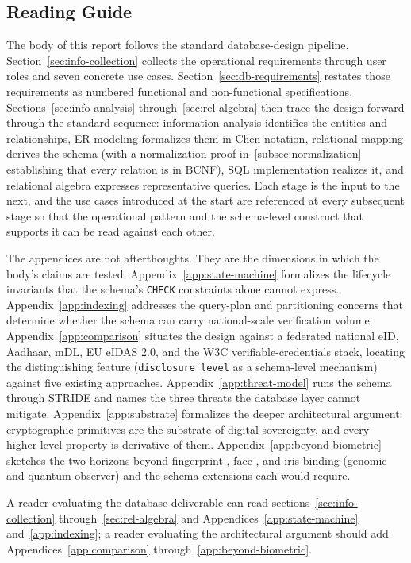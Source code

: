 \documentclass[11pt,letterpaper]{article}
\begin{document}
\subsection{Reading Guide}
\label{subsec:reading-guide}

The body of this report follows the standard database-design pipeline. Section~\ref{sec:info-collection} collects the operational requirements through user roles and seven concrete use cases. Section~\ref{sec:db-requirements} restates those requirements as numbered functional and non-functional specifications. Sections~\ref{sec:info-analysis} through~\ref{sec:rel-algebra} then trace the design forward through the standard sequence: information analysis identifies the entities and relationships, ER modeling formalizes them in Chen notation, relational mapping derives the schema (with a normalization proof in~\ref{subsec:normalization} establishing that every relation is in BCNF), SQL implementation realizes it, and relational algebra expresses representative queries. Each stage is the input to the next, and the use cases introduced at the start are referenced at every subsequent stage so that the operational pattern and the schema-level construct that supports it can be read against each other.

The appendices are not afterthoughts. They are the dimensions in which the body's claims are tested. Appendix~\ref{app:state-machine} formalizes the lifecycle invariants that the schema's \texttt{CHECK} constraints alone cannot express. Appendix~\ref{app:indexing} addresses the query-plan and partitioning concerns that determine whether the schema can carry national-scale verification volume. Appendix~\ref{app:comparison} situates the design against a federated national eID, Aadhaar, mDL, EU eIDAS 2.0, and the W3C verifiable-credentials stack, locating the distinguishing feature (\texttt{disclosure\_level} as a schema-level mechanism) against five existing approaches. Appendix~\ref{app:threat-model} runs the schema through STRIDE and names the three threats the database layer cannot mitigate. Appendix~\ref{app:substrate} formalizes the deeper architectural argument: cryptographic primitives are the substrate of digital sovereignty, and every higher-level property is derivative of them. Appendix~\ref{app:beyond-biometric} sketches the two horizons beyond fingerprint-, face-, and iris-binding (genomic and quantum-observer) and the schema extensions each would require.

A reader evaluating the database deliverable can read sections~\ref{sec:info-collection} through~\ref{sec:rel-algebra} and Appendices~\ref{app:state-machine} and~\ref{app:indexing}; a reader evaluating the architectural argument should add Appendices~\ref{app:comparison} through~\ref{app:beyond-biometric}.
\end{document}
